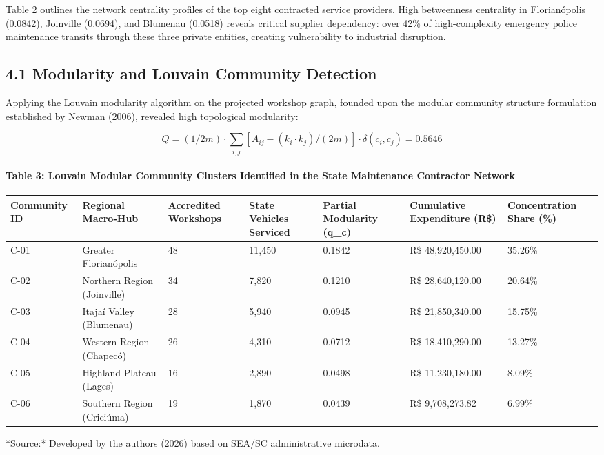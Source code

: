 \documentclass[10pt,a4paper,journal]{article}
\begin{document}
Table 2 outlines the network centrality profiles of the top eight contracted service providers. High betweenness centrality in Florianópolis (0.0842), Joinville (0.0694), and Blumenau (0.0518) reveals critical supplier dependency: over 42\% of high-complexity emergency police maintenance transits through these three private entities, creating vulnerability to industrial disruption.

\subsection{4.1 Modularity and Louvain Community Detection}
Applying the Louvain modularity algorithm on the projected workshop graph, founded upon the modular community structure formulation established by Newman (2006), revealed high topological modularity:

\begin{equation}
Q = (1 / 2m) \cdot \sum_{i,j} [ A_{ij} - (k_{i} \cdot k_{j}) / (2m) ] \cdot \delta(c_{i}, c_{j}) = 0.5646 \label{eq:5}
\end{equation}
\paragraph{Table 3: Louvain Modular Community Clusters Identified in the State Maintenance Contractor Network}
\begin{table}[htbp]
\centering
\small
\begin{tabular}{lllllll}
\toprule
Community ID & Regional Macro-Hub & Accredited Workshops & State Vehicles Serviced & Partial Modularity (q\_c) & Cumulative Expenditure (R\$) & Concentration Share (\%) \\
\midrule
C-01 & Greater Florianópolis & 48 & 11,450 & 0.1842 & R\$ 48,920,450.00 & 35.26\% \\
C-02 & Northern Region (Joinville) & 34 & 7,820 & 0.1210 & R\$ 28,640,120.00 & 20.64\% \\
C-03 & Itajaí Valley (Blumenau) & 28 & 5,940 & 0.0945 & R\$ 21,850,340.00 & 15.75\% \\
C-04 & Western Region (Chapecó) & 26 & 4,310 & 0.0712 & R\$ 18,410,290.00 & 13.27\% \\
C-05 & Highland Plateau (Lages) & 16 & 2,890 & 0.0498 & R\$ 11,230,180.00 & 8.09\% \\
C-06 & Southern Region (Criciúma) & 19 & 1,870 & 0.0439 & R\$ 9,708,273.82 & 6.99\% \\
\bottomrule
\end{tabular}
\end{table}
*Source:* Developed by the authors (2026) based on SEA/SC administrative microdata.
\end{document}

